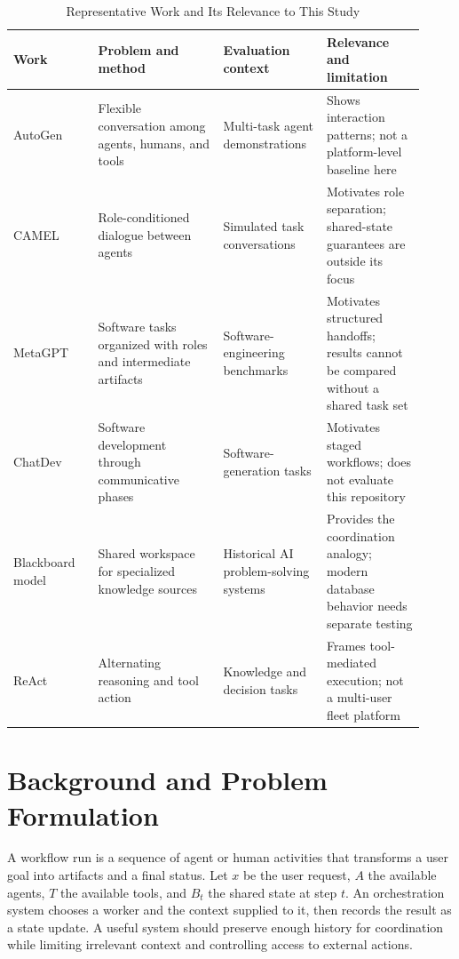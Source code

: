 \documentclass[12pt,onecolumn,draftclsnofoot]{IEEEtran}
\begin{document}
\begin{table}[t]
\centering
\caption{Representative Work and Its Relevance to This Study}
\label{tab:related-work}
\small
\begin{tabular}{@{}p{0.19\linewidth}p{0.28\linewidth}p{0.23\linewidth}p{0.22\linewidth}@{}}
\toprule
\textbf{Work} & \textbf{Problem and method} & \textbf{Evaluation context} & \textbf{Relevance and limitation} \\
\midrule
AutoGen \cite{wu2023autogen} & Flexible conversation among agents, humans, and tools & Multi-task agent demonstrations & Shows interaction patterns; not a platform-level baseline here \\
CAMEL \cite{li2023camel} & Role-conditioned dialogue between agents & Simulated task conversations & Motivates role separation; shared-state guarantees are outside its focus \\
MetaGPT \cite{hong2024metagpt} & Software tasks organized with roles and intermediate artifacts & Software-engineering benchmarks & Motivates structured handoffs; results cannot be compared without a shared task set \\
ChatDev \cite{qian2024communicative} & Software development through communicative phases & Software-generation tasks & Motivates staged workflows; does not evaluate this repository \\
Blackboard model \cite{nii1986blackboard} & Shared workspace for specialized knowledge sources & Historical AI problem-solving systems & Provides the coordination analogy; modern database behavior needs separate testing \\
ReAct \cite{yao2023react} & Alternating reasoning and tool action & Knowledge and decision tasks & Frames tool-mediated execution; not a multi-user fleet platform \\
\bottomrule
\end{tabular}
\end{table}

\section{Background and Problem Formulation}
A workflow run is a sequence of agent or human activities that transforms a user goal into artifacts and a final status. Let $x$ be the user request, $A$ the available agents, $T$ the available tools, and $B_t$ the shared state at step $t$. An orchestration system chooses a worker and the context supplied to it, then records the result as a state update. A useful system should preserve enough history for coordination while limiting irrelevant context and controlling access to external actions.
\end{document}
